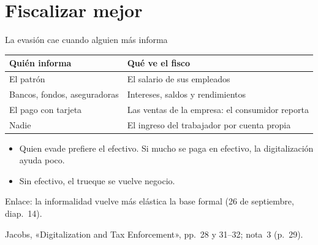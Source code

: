 \documentclass[aspectratio=169,11pt]{beamer}
\newcommand{\fuente}[1]{\par\vfill{\small\color{cGris}#1\par}}
\begin{document}
\section{Fiscalizar mejor}

\begin{frame}{La evasión cae cuando alguien más informa}
  \renewcommand{\arraystretch}{1.25}
  \begin{tabular}{@{}>{\raggedright\arraybackslash}p{}>{\raggedright\arraybackslash}p{}@{}}
    \toprule
    \textbf{Quién informa} & \textbf{Qué ve el fisco} \\
    \midrule
    El patrón & El salario de sus empleados \\
    Bancos, fondos, aseguradoras & Intereses, saldos y rendimientos \\
    El pago con tarjeta & Las ventas de la empresa: el consumidor reporta \\
    Nadie & El ingreso del trabajador por cuenta propia \\
    \bottomrule
  \end{tabular}
  \par\medskip
  \pause
  \begin{itemize}
    \item Quien evade prefiere el efectivo. Si mucho se paga en efectivo, la digitalización ayuda poco.
    \item Sin efectivo, el trueque se vuelve negocio.
  \end{itemize}
  \pause
  Enlace: la informalidad vuelve más elástica la base formal (26 de septiembre, diap.~14).
  \fuente{Jacobs, «Digitalization and Tax Enforcement», pp.~28 y 31--32; nota~3 (p.~29).}
\end{frame}
\end{document}
